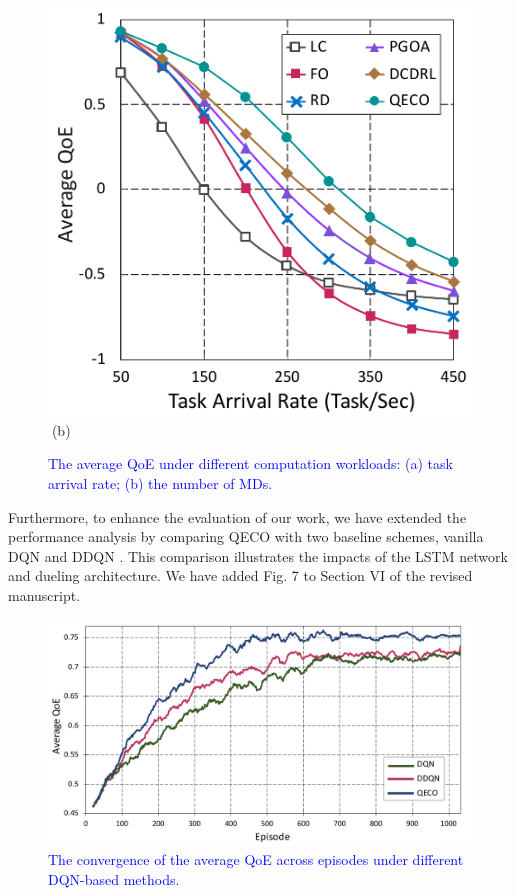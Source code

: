 \documentclass[12pt,draftclsnofoot,onecolumn]{IEEEtran}
\begin{document}
\begin{enumerate}
\begin{figure}[H]
\begin{minipage}[b]{0.3\linewidth}
		\includegraphics[width=\textwidth]{ qoe_1}
		\textcolor{white}{i}\hspace{0.6cm}(b)
	\end{minipage}

	\caption{\textcolor{blue}{The average QoE under different computation workloads: (a) task arrival rate; (b) the number of MDs.}}
	\label{chart44}
\end{figure} 

Furthermore, to enhance the evaluation of our work, we have extended the performance analysis by comparing QECO with two baseline schemes, vanilla DQN and DDQN \cite{van2016deep}. This comparison illustrates the impacts of the LSTM network and dueling architecture. We have added Fig. 7 to Section VI of the revised manuscript.

\begin{figure}[H]
	\captionsetup{name=Fig.}
	\centering
	\includegraphics[width=.6\linewidth]{m1}
	\vspace*{-3mm}
	\caption{\textcolor{blue}{The convergence of the average QoE across episodes under different DQN-based methods.}}
	\vspace*{-3mm}
	\label{chartC0}
\end{figure}


\end{enumerate}
\end{document}
